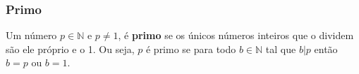 \subsubsection*{Primo}
Um número $p \in \mathbb{N}$ e $p \neq 1$, é \textbf{primo} se os únicos números inteiros que o dividem são ele próprio e o 1. Ou seja, $p$ é primo se para todo $b \in \mathbb{N}$ tal que $b|p$ então $b=p$ ou $b=1$.

